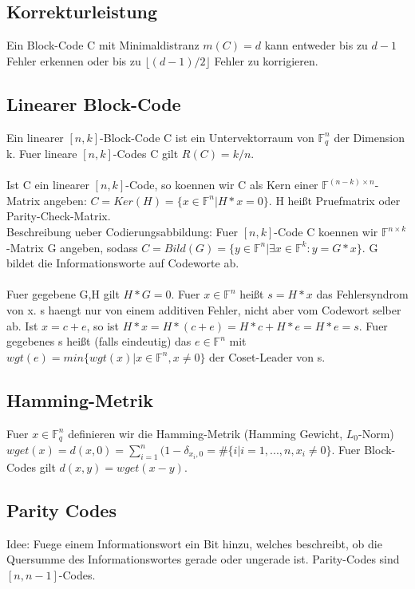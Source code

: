 \documentclass[a4paper]{scrreprt}
\begin{document}
\subsection{Korrekturleistung}
Ein Block-Code C mit Minimaldistranz $m(C) = d$ kann entweder bis zu $d-1$ Fehler erkennen oder bis zu $\lfloor (d-1)/2 \rfloor$ Fehler zu korrigieren.

\subsection{Linearer Block-Code}
Ein linearer $[n,k]$-Block-Code C ist ein Untervektorraum von $\mathbb{F}_q^n$ der Dimension k.
Fuer lineare $[n,k]$-Codes C gilt $R(C) = k/n$.\\\\
Ist C ein linearer $[n,k]$-Code, so koennen wir C als Kern einer $\mathbb{F}^{(n-k)\times n}$-Matrix angeben: $C = Ker(H) = \{x \in \mathbb{F}^n|H*x = 0\}$.
H heißt Pruefmatrix oder Parity-Check-Matrix.\\
Beschreibung ueber Codierungsabbildung: Fuer $[n,k]$-Code C koennen wir $\mathbb{F}^{n \times k}$-Matrix G angeben, sodass $C = Bild(G) = \{y \in \mathbb{F}^n|\exists x \in \mathbb{F}^k:y = G*x\}$.
G bildet die Informationsworte auf Codeworte ab.\\\\
Fuer gegebene G,H gilt $H*G = 0$.
Fuer $x \in \mathbb{F}^n$ heißt $s = H*x$ das Fehlersyndrom von x.
s haengt nur von einem additiven Fehler, nicht aber vom Codewort selber ab. Ist $x = c+e$, so ist $H * x = H*(c+e) = H*c + H*e = H*e = s$.
Fuer gegebenes s heißt (falls eindeutig) das $e \in \mathbb{F}^n$ mit $wgt(e) = min\{wgt(x)|x \in \mathbb{F}^n, x \neq 0\}$ der Coset-Leader von s.

\subsection{Hamming-Metrik}
Fuer $x \in \mathbb{F}_q^n$ definieren wir die Hamming-Metrik (Hamming Gewicht, $L_0$-Norm) $wget(x) = d(x,0) = \sum_{i=1}^n(1-\delta_{x_i,0} = \#\{i|i=1,...,n,x_i \neq 0\}$.
Fuer Block-Codes gilt $d(x,y) = wget(x-y)$.

\subsection{Parity Codes}
Idee: Fuege einem Informationswort ein Bit hinzu, welches beschreibt, ob die Quersumme des Informationswortes gerade oder ungerade ist. Parity-Codes sind $[n, n-1]$-Codes.
\end{document}
